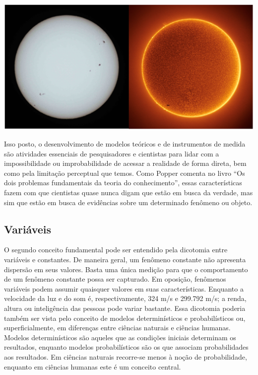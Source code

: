 \documentclass[
]{book}
\begin{document}
\includegraphics{./img/cap_sol.png}

Isso posto, o desenvolvimento de modelos teóricos e de instrumentos de medida são atividades essenciais de pesquisadores e cientistas para lidar com a impossibilidade ou improbabilidade de acessar a realidade de forma direta, bem como pela limitação perceptual que temos. Como Popper comenta no livro ``Os dois problemas fundamentais da teoria do conhecimento'', essas características fazem com que cientistas quase nunca digam que estão em busca da verdade, mas sim que estão em busca de evidências sobre um determinado fenômeno ou objeto.

\hypertarget{variuxe1veis}{%
\subsection{Variáveis}\label{variuxe1veis}}

O segundo conceito fundamental pode ser entendido pela dicotomia entre variáveis e constantes. De maneira geral, um fenômeno constante não apresenta dispersão em seus valores. Basta uma única medição para que o comportamento de um fenômeno constante possa ser capturado. Em oposição, fenômenos variáveis podem assumir quaisquer valores em suas características. Enquanto a velocidade da luz e do som é, respectivamente, 324 m/s e 299.792 m/s; a renda, altura ou inteligência das pessoas pode variar bastante. Essa dicotomia poderia também ser vista pelo conceito de modelos determinísticos e probabilísticos ou, superficialmente, em diferenças entre ciências naturais e ciências humanas. Modelos determinísticos são aqueles que as condições iniciais determinam os resultados, enquanto modelos probabilísticos são os que associam probabilidades aos resultados. Em ciências naturais recorre-se menos à noção de probabilidade, enquanto em ciências humanas este é um conceito central.
\end{document}
